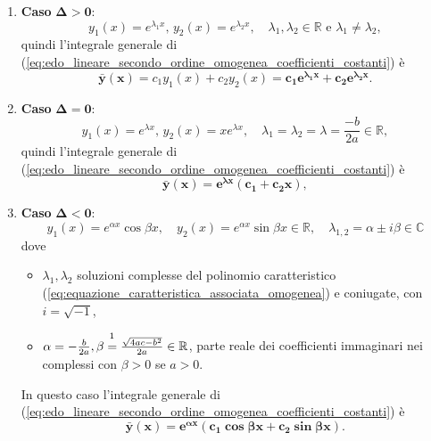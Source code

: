 \begin{enumerate}
	\item \textbf{Caso} $\boldsymbol{\Delta>0}$:
	\begin{equation}\label{eq:soluzioni_omogenea_secondo_grado_delta_negativa}
		y_1(x) = e^{\lambda_1 x},\, y_2(x) = e^{\lambda_2 x},\quad \lambda_1,\lambda_2\in\mathbb{R}\text{ e } \lambda_1\neq\lambda_2,
	\end{equation}
	quindi l'integrale generale di (\ref{eq:edo_lineare_secondo_ordine_omogenea_coefficienti_costanti}) è
	\begin{equation}\label{eq:integrale_generale_edo_lineare_secondo_ordine_omogenea_coefficienti_costanti_Delta_>_0}
		\boldsymbol{\bar y(x)} = c_1 y_1(x)+ c_2y_2(x) = \boldsymbol{c_1 e^{\lambda_1 x} + c_2 e^{\lambda_2 x}}.
	\end{equation}
	\item \textbf{Caso} $\boldsymbol{\Delta = 0}$:
	\begin{equation}\label{eq:soluzioni_omogenea_secondo_grado_delta_zero}
		y_1(x) = e^{\lambda x},\, y_2(x)=x e^{\lambda x},\quad \lambda_1=\lambda_2=\lambda=\frac{-b}{2a}\in\mathbb{R},
	\end{equation}
	quindi l'integrale generale di (\ref{eq:edo_lineare_secondo_ordine_omogenea_coefficienti_costanti}) è
	\begin{equation}\label{eq:integrale_generale_edo_lineare_secondo_ordine_omogenea_coefficienti_costanti_Delta_=_0}
		\boldsymbol{\bar y(x) = e^{\lambda x}(c_1+c_2 x)}, 
	\end{equation}
	\item \textbf{Caso} $\boldsymbol{\Delta<0}$:
	\begin{equation}\label{eq:soluzioni_omogenea_secondo_grado_delta_positiva}
		y_1(x) = e^{\alpha x}\cos\beta x,\quad y_2(x) = e^{\alpha x} \sin\beta x\in\mathbb{R},\quad \lambda_{1,2}=\alpha \pm i \beta\in\mathbb{C}
	\end{equation}
	dove
	\begin{itemize}
		\item $\lambda_1,\lambda_2$ soluzioni complesse del polinomio caratteristico (\ref{eq:equazione_caratteristica_associata_omogenea}) e coniugate, con $i=\sqrt{-1}$,
		\item $\alpha = -\frac{b}{2a}, \beta\overset{\footnotemark}{=}\frac{\sqrt{4ac-b^2}}{2a}\in\mathbb{R}$, parte reale dei coefficienti immaginari nei complessi con $\beta>0$ se $a>0$.
	\end{itemize}
	In questo caso l'integrale generale di (\ref{eq:edo_lineare_secondo_ordine_omogenea_coefficienti_costanti}) è
	\begin{equation}\label{eq:integrale_generale_edo_lineare_secondo_ordine_omogenea_coefficienti_costanti_Delta_<_0}
		\boldsymbol{\bar y(x) = e^{\alpha x}(c_1\cos\beta x + c_2\sin\beta x)}.
	\end{equation}
\end{enumerate}

